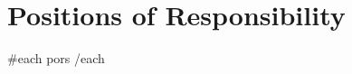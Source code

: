 \section{Positions of Responsibility}
    \resumeSubHeadingListStart
        {{#each pors}}
        {{/each}}
    \resumeSubHeadingListEnd